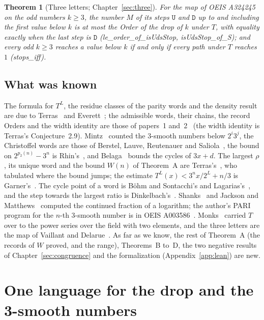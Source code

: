 \documentclass[10pt,a4paper,titlepage]{article}
\newcommand{\lean}[1]{\textsf{#1}}
\newtheorem{mainthm}{Theorem}
\begin{document}
\begin{mainthm}[Three letters; Chapter~\ref{sec:three}]
For the map of OEIS A324245 on the odd numbers $k \ge 3$, the number $M$ of its steps
$\mathtt{U}$ and $\mathtt{D}$ up to and including the first value below $k$ is at most the Order of the drop of $k$
under $T$, with equality exactly when the last step is $\mathtt{D}$
(\lean{le\_order\_of\_isUdsStop}, \lean{isUdsStop\_of\_S}); and every odd $k \ge 3$
reaches a value below $k$ if and only if every path under $T$ reaches $1$
(\lean{stops\_iff}).
\end{mainthm}

\subsection*{What was known}

The formula for $T^{L}$, the residue classes of the parity words and the density result
are due to Terras~\cite{Terras1976} and Everett~\cite{Everett1977}; the admissible words,
their chains, the record Orders and the width identity are those of
papers~1 and~2~\cite{Paper1,Paper2} (the width identity is Terras's Conjecture~2.9).
Mintz~\cite{Mintz1981} counted the $3$-smooth numbers below $2^i 3^j$, the Christoffel
words are those of Berstel, Lauve, Reutenauer and Saliola~\cite{BerstelLRS2008}, the
bound on $2^{p_2(n)} - 3^n$ is Rhin's~\cite{Rhin1987}, and Belaga~\cite{Belaga2003}
bounds the cycles of $3x + d$. The largest $\rho$, its unique word and the bound $W(n)$ of
Theorem~A are Terras's~\cite[Thm.~2.6, Thm.~2.10]{Terras1976}, who tabulated where the bound
jumps; the estimate $T^{L}(x) < 3^n x/2^L + n/3$ is Garner's~\cite{Garner1981}. The cycle point of a
word is B\"ohm and Sontacchi's and Lagarias's~\cite{BohmSontacchi1978,Lagarias1990}, and the
step towards the largest ratio is Dinkelbach's~\cite{Dinkelbach1967}. Shanks~\cite{Shanks1954} and Jackson and
Matthews~\cite{JacksonMatthews2002} computed the continued fraction of a logarithm; the
author's PARI program for the $n$-th $3$-smooth number is in OEIS
A003586~\cite{OEIS_A003586}. Monks~\cite{Monks2025} carried $T$ over to the power series
over the field with two elements, and the three letters are the map of Vaillant and
Delarue~\cite{VaillantDelarue2019}. As far as we know, the rest of Theorem~A (the records of $W$ proved, and the range),
Theorems~B to~D, the two negative results of Chapter~\ref{sec:congruence} and the
formalization (Appendix~\ref{app:lean}) are new.

\section{One language for the drop and the 3-smooth numbers}
\label{sec:language}
\end{document}

